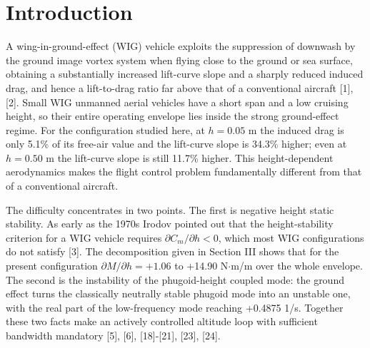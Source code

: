 \documentclass[conference]{IEEEtran}
\begin{document}
\section{Introduction}
A wing-in-ground-effect (WIG) vehicle exploits the suppression of downwash by the ground image vortex system when flying close to the ground or sea surface, obtaining a substantially increased lift-curve slope and a sharply reduced induced drag, and hence a lift-to-drag ratio far above that of a conventional aircraft [1], [2]. Small WIG unmanned aerial vehicles have a short span and a low cruising height, so their entire operating envelope lies inside the strong ground-effect regime. For the configuration studied here, at $h = 0.05$ m the induced drag is only 5.1\% of its free-air value and the lift-curve slope is 34.3\% higher; even at $h = 0.50$ m the lift-curve slope is still 11.7\% higher. This height-dependent aerodynamics makes the flight control problem fundamentally different from that of a conventional aircraft.

The difficulty concentrates in two points. The first is negative height static stability. As early as the 1970s Irodov pointed out that the height-stability criterion for a WIG vehicle requires $\partial C_m/\partial h < 0$, which most WIG configurations do not satisfy [3]. The decomposition given in Section III shows that for the present configuration $\partial M/\partial h = +1.06$ to +14.90 N$\cdot$m/m over the whole envelope. The second is the instability of the phugoid-height coupled mode: the ground effect turns the classically neutrally stable phugoid mode into an unstable one, with the real part of the low-frequency mode reaching +0.4875 1/s. Together these two facts make an actively controlled altitude loop with sufficient bandwidth mandatory [5], [6], [18]-[21], [23], [24].
\end{document}
